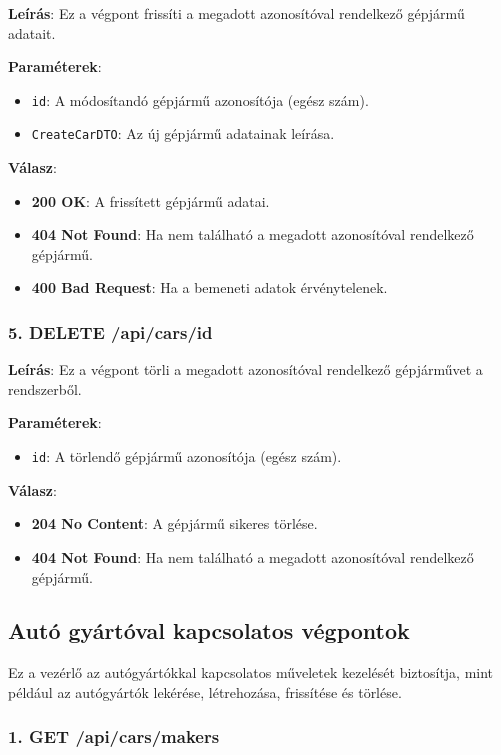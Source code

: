 \documentclass{report}[11pt]
\begin{document}
\textbf{Leírás}:  
Ez a végpont frissíti a megadott azonosítóval rendelkező gépjármű adatait.

\textbf{Paraméterek}:  
\begin{itemize}
    \item \texttt{id}: A módosítandó gépjármű azonosítója (egész szám).
    \item \texttt{CreateCarDTO}: Az új gépjármű adatainak leírása.
\end{itemize}

\textbf{Válasz}:  
\begin{itemize}
    \item \textbf{200 OK}: A frissített gépjármű adatai.
    \item \textbf{404 Not Found}: Ha nem található a megadott azonosítóval rendelkező gépjármű.
    \item \textbf{400 Bad Request}: Ha a bemeneti adatok érvénytelenek.
\end{itemize}

\subsubsection{5. DELETE /api/cars/{id}}

\textbf{Leírás}:  
Ez a végpont törli a megadott azonosítóval rendelkező gépjárművet a rendszerből.

\textbf{Paraméterek}:  
\begin{itemize}
    \item \texttt{id}: A törlendő gépjármű azonosítója (egész szám).
\end{itemize}

\textbf{Válasz}:  
\begin{itemize}
    \item \textbf{204 No Content}: A gépjármű sikeres törlése.
    \item \textbf{404 Not Found}: Ha nem található a megadott azonosítóval rendelkező gépjármű.
\end{itemize}

\subsection{Autó gyártóval kapcsolatos végpontok}

Ez a vezérlő az autógyártókkal kapcsolatos műveletek kezelését biztosítja, mint például az autógyártók lekérése, létrehozása, frissítése és törlése.

\subsubsection{1. GET /api/cars/makers}
\end{document}
